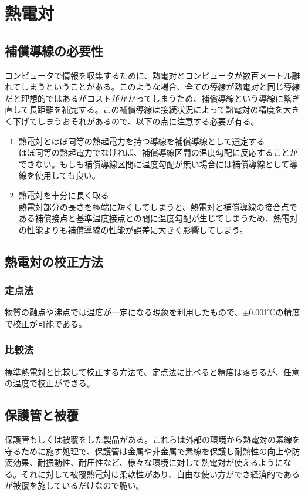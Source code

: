 \documentclass[a4j,twoside,openright,11pt]{jarticle}
\begin{document}
\section{熱電対}
\subsection{補償導線の必要性}
コンピュータで情報を収集するために、熱電対とコンピュータが数百メートル離れてしまうということがある。このような場合、全ての導線が熱電対と同じ導線だと理想的ではあるがコストがかかってしまうため、補償導線という導線に繋ぎ直して長距離を補完する。この補償導線は接続状況によって熱電対の精度を大きく下げてしまうおそれがあるので、以下の点に注意する必要が有る。
\begin{enumerate}
\item 熱電対とほぼ同等の熱起電力を持つ導線を補償導線として選定する\\
ほぼ同等の熱起電力でなければ、補償導線区間の温度勾配に反応することができない。もしも補償導線区間に温度勾配が無い場合には補償導線として導線を使用しても良い。
\item 熱電対を十分に長く取る\\
熱電対部分の長さを極端に短くしてしまうと、熱電対と補償導線の接合点である補償接点と基準温度接点との間に温度勾配が生じてしまうため、熱電対の性能よりも補償導線の性能が誤差に大きく影響してしまう。
\end{enumerate}

\subsection{熱電対の校正方法}
\subsubsection{定点法}
物質の融点や沸点では温度が一定になる現象を利用したもので、$\pm$0.001℃の精度で校正が可能である。
\subsubsection{比較法}
標準熱電対と比較して校正する方法で、定点法に比べると精度は落ちるが、任意の温度で校正ができる。

\subsection{保護管と被覆}
保護管もしくは被覆をした製品がある。これらは外部の環境から熱電対の素線を守るために施す処理で、保護管は金属や非金属で素線を保護し耐熱性の向上や防滴効果、耐振動性、耐圧性など、様々な環境に対して熱電対が使えるようになる。それに対して被覆熱電対は柔軟性があり、自由な使い方ができ経済的であるが被覆を施しているだけなので脆い。
\end{document}
